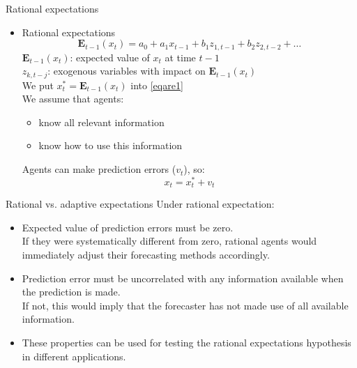 \documentclass{beamer}
\begin{document}
\begin{frame}{Rational expectations}
\begin{itemize}
\item Rational expectations
$$\mathbf{E}_{t-1}(x_t)=a_0+a_1 x_{t-1} + b_1 z_{1,t-1}+b_2 z_{2, t-2}+\dots$$
$\mathbf{E}_{t-1}(x_t)$: expected value of $x_t$ at time $t-1$\\
$z_{k,t-j}$: exogenous variables with impact on $\mathbf{E}_{t-1}(x_t)$\\
\vspace{0.3cm}
We put $x_t^\ast = \mathbf{E}_{t-1}(x_t)$ into \eqref{eqare1}\\
\vspace{0.3cm}
We assume that agents:
\begin{itemize}
\item know all relevant information
\item know how to use this information
\end{itemize}
\vspace{0.3cm}
Agents can make prediction errors ($v_t$), so: $$x_t=x^\ast_t+v_t $$
\end{itemize}
\end{frame}


\begin{frame}{Rational vs. adaptive expectations}
Under rational expectation:
\vspace{0.3cm}
\begin{itemize}
\item Expected value of prediction errors must be zero. \\If they were systematically different from zero, rational agents would immediately adjust their forecasting methods accordingly.
\vspace{0.3cm}
\item Prediction error must be uncorrelated with any information available when the prediction is made. \\If not, this would imply that the forecaster has not made use of all
available information.
\vspace{0.3cm}
\item These properties can be used for testing the rational expectations hypothesis in different applications.
\end{itemize}
\end{frame}

\end{document}
